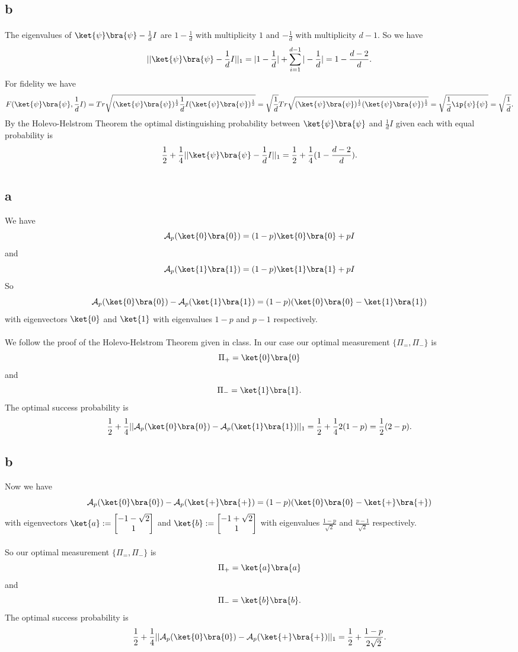 \documentclass[letterpaper,12pt,oneside,onecolumn]{article}
\newcommand{\cA}{\mathcal{A}} \newcommand{\cB}{\mathcal{B}}
\begin{document}
\subsection{b}
\paragraph{}
The eigenvalues of $\ket{\psi}\bra{\psi} - \frac{1}{d}I$ are $1-\frac{1}{d}$ with multiplicity $1$ and $-\frac{1}{d}$ with multiplicity $d-1$.
So we have $$||\ket{\psi}\bra{\psi} - \frac{1}{d}I ||_1 = |1-\frac{1}{d}| + \sum_{i=1}^{d-1} |-\frac{1}{d}| =1 - \frac{d-2}{d}.$$
For fidelity we have
$$F(\ket{\psi}\bra{\psi}, \frac{1}{d}I) = Tr\sqrt{(\ket{\psi}\bra{\psi})^\frac{1}{2}\frac{1}{d}I (\ket{\psi}\bra{\psi})^\frac{1}{2} } = \sqrt{\frac{1}{d}}Tr\sqrt{(\ket{\psi}\bra{\psi})^\frac{1}{2}(\ket{\psi}\bra{\psi})^\frac{1}{2}} = \sqrt{\frac{1}{d}\ip{\psi}{\psi}} = \sqrt{\frac{1}{d}}.$$
By the Holevo-Helstrom Theorem the optimal distinguishing probability between $\ket{\psi}\bra{\psi}$ and $\frac{1}{d}I$ given each with equal probability is
$$\frac{1}{2} + \frac{1}{4}||\ket{\psi}\bra{\psi} - \frac{1}{d}I ||_1 = \frac{1}{2} + \frac{1}{4}(1 - \frac{d-2}{d}).$$
\section{}
\subsection{a}
We have
$$\cA_p(\ket{0}\bra{0}) = (1-p)\ket{0}\bra{0} + pI$$
and
$$\cA_p(\ket{1}\bra{1}) = (1-p)\ket{1}\bra{1} + pI$$
So
$$\cA_p(\ket{0}\bra{0}) - \cA_p(\ket{1}\bra{1})  = (1-p)(\ket{0}\bra{0} - \ket{1}\bra{1})$$
with eigenvectors $\ket{0}$ and $\ket{1}$ with eigenvalues $1-p$ and $p-1$ respectively.
\paragraph{}
We follow the proof of the Holevo-Helstrom Theorem given in class. In our case our optimal measurement $\{\Pi_=, \Pi_-\}$ is
$$\Pi_+ = \ket{0}\bra{0}$$
and
$$\Pi_- = \ket{1}\bra{1}.$$
The optimal success probability is
$$\frac{1}{2} + \frac{1}{4}||\cA_p(\ket{0}\bra{0}) - \cA_p(\ket{1}\bra{1})||_1 = \frac{1}{2} + \frac{1}{4}2(1-p) = \frac{1}{2} (2-p).$$
\subsection{b}
Now we have
$$\cA_p(\ket{0}\bra{0}) - \cA_p(\ket{+}\bra{+}) = (1-p)(\ket{0}\bra{0} - \ket{+}\bra{+})$$
with eigenvectors $\ket{a} := \begin{bmatrix} -1-\sqrt{2} \\ 1\end{bmatrix}$ and $\ket{b} :=\begin{bmatrix} -1 + \sqrt{2} \\ 1 \end{bmatrix}$ with eigenvalues $\frac{1-p}{\sqrt{2}}$ and $\frac{p-1}{\sqrt{2}}$ respectively.
\paragraph{}
So our optimal measurement $\{\Pi_=, \Pi_-\}$ is
$$\Pi_+ = \ket{a}\bra{a}$$
and
$$\Pi_- = \ket{b}\bra{b}.$$
The optimal success probability is
$$\frac{1}{2} + \frac{1}{4}||\cA_p(\ket{0}\bra{0}) - \cA_p(\ket{+}\bra{+})||_1 = \frac{1}{2} +\frac{1-p}{2\sqrt{2}}. $$
\end{document}
